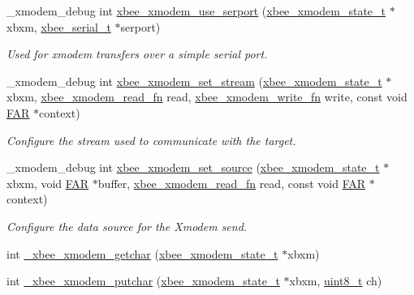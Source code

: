 \begin{DoxyCompactItemize}
\item 
\-\_\-xmodem\-\_\-debug int \hyperlink{group__util__xmodem_ga728dd61f38b5563fe2ab45bcb982a1e7}{xbee\-\_\-xmodem\-\_\-use\-\_\-serport} (\hyperlink{structxbee__xmodem__state__t}{xbee\-\_\-xmodem\-\_\-state\-\_\-t} $\ast$xbxm, \hyperlink{structxbee__serial__t}{xbee\-\_\-serial\-\_\-t} $\ast$serport)
\begin{DoxyCompactList}\small\item\em Used for xmodem transfers over a simple serial port. \end{DoxyCompactList}\item 
\-\_\-xmodem\-\_\-debug int \hyperlink{group__util__xmodem_ga3153bea635e130326e96720fe354852d}{xbee\-\_\-xmodem\-\_\-set\-\_\-stream} (\hyperlink{structxbee__xmodem__state__t}{xbee\-\_\-xmodem\-\_\-state\-\_\-t} $\ast$xbxm, \hyperlink{group__util__xmodem_gae8f23aee23fead01c5b812e992799ded}{xbee\-\_\-xmodem\-\_\-read\-\_\-fn} read, \hyperlink{group__util__xmodem_gad858784eff97e98dff61dda16fada3b2}{xbee\-\_\-xmodem\-\_\-write\-\_\-fn} write, const void \hyperlink{group__hal_gaef060b3456fdcc093a7210a762d5f2ed}{F\-A\-R} $\ast$context)
\begin{DoxyCompactList}\small\item\em Configure the stream used to communicate with the target. \end{DoxyCompactList}\item 
\-\_\-xmodem\-\_\-debug int \hyperlink{group__util__xmodem_gaa71f0823f6fc8db3f7c556819079b225}{xbee\-\_\-xmodem\-\_\-set\-\_\-source} (\hyperlink{structxbee__xmodem__state__t}{xbee\-\_\-xmodem\-\_\-state\-\_\-t} $\ast$xbxm, void \hyperlink{group__hal_gaef060b3456fdcc093a7210a762d5f2ed}{F\-A\-R} $\ast$buffer, \hyperlink{group__util__xmodem_gae8f23aee23fead01c5b812e992799ded}{xbee\-\_\-xmodem\-\_\-read\-\_\-fn} read, const void \hyperlink{group__hal_gaef060b3456fdcc093a7210a762d5f2ed}{F\-A\-R} $\ast$context)
\begin{DoxyCompactList}\small\item\em Configure the data source for the Xmodem send. \end{DoxyCompactList}\item 
int \hyperlink{group__util__xmodem_gac01df75671906e590a9ed9b0a4644ba1}{\-\_\-xbee\-\_\-xmodem\-\_\-getchar} (\hyperlink{structxbee__xmodem__state__t}{xbee\-\_\-xmodem\-\_\-state\-\_\-t} $\ast$xbxm)
\item 
int \hyperlink{group__util__xmodem_ga0cc061cd92dfa4eba4720b2839698545}{\-\_\-xbee\-\_\-xmodem\-\_\-putchar} (\hyperlink{structxbee__xmodem__state__t}{xbee\-\_\-xmodem\-\_\-state\-\_\-t} $\ast$xbxm, \hyperlink{group__hal_gae1affc9ca37cfb624959c866a73f83c2}{uint8\-\_\-t} ch)

\end{DoxyCompactItemize}
